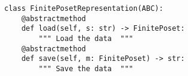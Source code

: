 \par\begin{minipage}{60ex}
\begin{verbatim}
class FinitePosetRepresentation(ABC):
    @abstractmethod
    def load(self, s: str) -> FinitePoset:
        """ Load the data  """
    @abstractmethod
    def save(self, m: FinitePoset) -> str:
        """ Save the data  """
\end{verbatim}
\end{minipage}\par